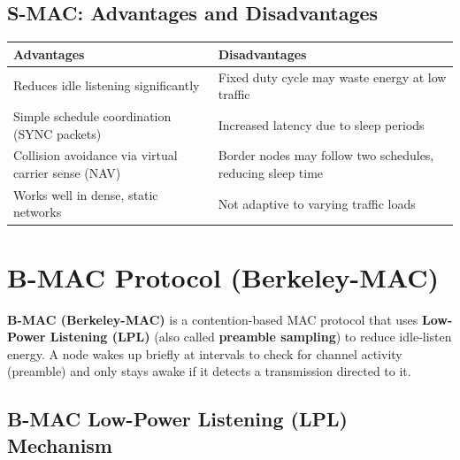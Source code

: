 \documentclass[12pt,a4paper]{article}
\renewcommand{\arraystretch}{1.45}
\begin{document}
\subsection{S-MAC: Advantages and Disadvantages}

\par\noindent
{\renewcommand{\arraystretch}{1.5}%
\begin{tabularx}{\linewidth}{|Y|Y|}
\hline
\textbf{Advantages} & \textbf{Disadvantages} \\
\hline
Reduces idle listening significantly & Fixed duty cycle may waste energy at low traffic \\
\hline
Simple schedule coordination (SYNC packets) & Increased latency due to sleep periods \\
\hline
Collision avoidance via virtual carrier sense (NAV) & Border nodes may follow two schedules, reducing sleep time \\
\hline
Works well in dense, static networks & Not adaptive to varying traffic loads \\
\hline
\end{tabularx}}

\section{B-MAC Protocol (Berkeley-MAC)}

\begin{tcolorbox}[defbox, title={\textbf{B-MAC --- Definition}}]
\textbf{B-MAC (Berkeley-MAC)} is a contention-based MAC protocol that uses \textbf{Low-Power Listening (LPL)} (also called \textbf{preamble sampling}) to reduce idle-listen energy. A node wakes up briefly at intervals to check for channel activity (preamble) and only stays awake if it detects a transmission directed to it.
\end{tcolorbox}

\subsection{B-MAC Low-Power Listening (LPL) Mechanism}
\end{document}
